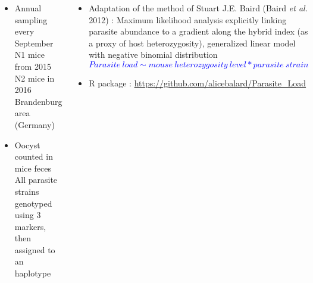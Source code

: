 \documentclass[30pt, a0paper, portrait, margin=0mm, innermargin=15mm,
               blockverticalspace=15mm, colspace=15mm, subcolspace=8mm]{tikzposter}
\begin{document}
\begin{columns}
      {
\vfill
\begin{minipage}{0.3\linewidth}
    \includegraphics[width=2\linewidth]{Rplot.pdf}
\end{minipage}
\hspace{11cm}
\begin{minipage}{0.4\linewidth}
 \begin{itemize}
      \item{Annual sampling every September\\ N1 mice from 2015\\ N2 mice in 2016 \\Brandenburg area (Germany)}
       \item{Oocyst counted in mice feces\\ All parasite strains genotyped using 3 markers, then assigned to an \\haplotype}
       \end{itemize}
\end{minipage}

        \begin{itemize}
     
      \item Adaptation of the method of Stuart J.E. Baird (Baird \textit{et al.} 2012) : Maximum likelihood analysis explicitly linking parasite abundance to a gradient along the hybrid index (as a proxy of host heterozygosity), generalized linear model with negative binomial distribution \vspace{+1ex}
      \textcolor{blue}{\[Parasite\ load \sim mouse\ heterozygosity\ level * parasite\ strain  \]}\vspace{-2ex}%
      \item R package : \url{https://github.com/alicebalard/Parasite_Load}
      \end{itemize}
      }


\end{columns}
\end{document}

